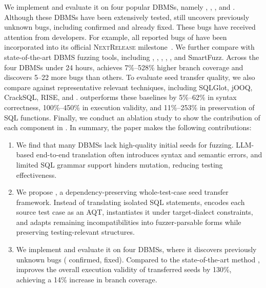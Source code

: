 \documentclass[conference]{IEEEtran}
\begin{document}
We implement \tool{} and evaluate it on four popular DBMSs, namely \duckdb{}, \clickhouse{}, \monetdb{}, and \virtuoso{}.
Although these DBMSs have been extensively tested, \tool{} still uncovers \bugcnt{} previously unknown bugs, including \bugconfirmcnt{} confirmed and \bugfixcnt{} already fixed.
These bugs have received attention from developers.
For example, all reported bugs of \monetdb{} have been incorporated into its official \textsc{NextRelease} milestone~\cite{monetdb-nextrelease}.
We further compare \tool{} with state-of-the-art DBMS fuzzing tools, including \sqlancer{}, \sqlright{}, \squirrel{}, \griffin{}, \sedar{}, and SmartFuzz.
Across the four DBMSs under 24 hours, \tool{} achieves 7\%--528\% higher branch coverage and discovers 5--22 more bugs than others.
To evaluate seed transfer quality, we also compare \tool{} against representative relevant techniques, including SQLGlot, jOOQ, CrackSQL, RISE, and \sedar{}.
\tool{} outperforms these baselines by 5\%--62\% in syntax correctness, 100\%--450\% in execution validity, and 11\%--253\% in preservation of SQL functions.
Finally, we conduct an ablation study to show the contribution of each component in \tool{}.
In summary, the paper makes the following contributions:


\begin{enumerate}[leftmargin=*]
\item We find that many DBMSs lack high-quality initial seeds for fuzzing. LLM-based end-to-end translation often introduces syntax and semantic errors, and limited SQL grammar support hinders mutation, reducing testing effectiveness.
\item We propose \tool{}, a dependency-preserving whole-test-case seed transfer framework. Instead of translating isolated SQL statements, \tool{} encodes each source test case as an AQT, instantiates it under target-dialect constraints, and adapts remaining incompatibilities into fuzzer-parsable forms while preserving testing-relevant structures.
\item We implement \tool{} and evaluate it on four DBMSs, where it discovers \bugcnt{} previously unknown bugs (\bugconfirmcnt{} confirmed, \bugfixcnt{} fixed). 
Compared to the state-of-the-art method \sedar{}, \tool{} improves the overall execution validity of transferred seeds by 130\%, achieving a 14\% increase in branch coverage.
\end{enumerate}
\end{document}
